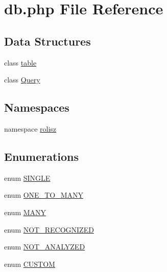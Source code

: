 \hypertarget{db_8php}{
\section{db.php File Reference}
\label{db_8php}
}
\subsection*{Data Structures}
\begin{DoxyCompactItemize}
\item 
class \hyperlink{classtable}{table}
\item 
class \hyperlink{class_query}{Query}
\end{DoxyCompactItemize}
\subsection*{Namespaces}
\begin{DoxyCompactItemize}
\item 
namespace \hyperlink{namespacerolisz}{rolisz}
\end{DoxyCompactItemize}
\subsection*{Enumerations}
\begin{DoxyCompactItemize}
\item 
enum \hyperlink{db_8php_a76b06276bbadc1b8d9e716c5d9326919}{SINGLE} 
\item 
enum \hyperlink{db_8php_ad2a8019952a8ce0c04e4fb3fbb4fe266}{ONE\_\-TO\_\-MANY} 
\item 
enum \hyperlink{db_8php_a0146ef09f9a37e6ec7dbd719390f9de4}{MANY} 
\item 
enum \hyperlink{db_8php_a1b965efd4e0428b37a632346f4eef7e1}{NOT\_\-RECOGNIZED} 
\item 
enum \hyperlink{db_8php_ab2ccf7b117b4b822d61c1a3a07a528a2}{NOT\_\-ANALYZED} 
\item 
enum \hyperlink{db_8php_adb36c4e2bb36018570c94f4e1ad0f19c}{CUSTOM} 
\end{DoxyCompactItemize}


